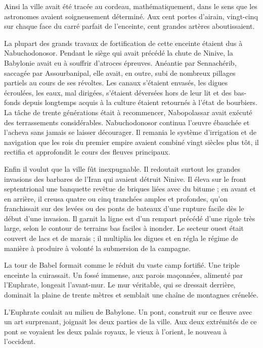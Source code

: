 \documentclass[a4paper, 11pt, oneside, polutonikogreek, french]{article}
\begin{document}
Ainsi la ville avait été tracée au cordeau, mathématiquement, dans le sens que les astronomes avaient soigneusement déterminé. Aux cent portes d'airain, vingt-cinq sur chaque face du carré parfait de l'enceinte, cent grandes artères aboutissaient.

\bigskip
\centerline{\EightStarTaper}
\centerline{\EightStarTaper\EightStarTaper}
\bigskip

La plupart des grands travaux de fortification de cette enceinte étaient dus à Nabuchodonosor. Pendant le siège qui avait précédé la chute de Ninive, la Babylonie avait eu à souffrir d'atroces épreuves. Anéantie par Sennachérib, saccagée par Assourbanipal, elle avait, en outre, subi de nombreux pillages partiels au cours de ses révoltes. Les canaux s'étaient envasés, les digues écroulées, les eaux, mal dirigées, s'étaient déversées hors de leur lit et des bas-fonds depuis longtemps acquis à la culture étaient retournés à l'état de bourbiers. La tâche de trente générations était à recommencer, Nabopolassar avait exécuté des terrassements considérables. Nabuchodonosor continua l'œuvre ébauchée et l'acheva sans jamais se laisser décourager. Il remania le système d'irrigation et de navigation que les rois du premier empire avaient combiné vingt siècles plus tôt, il rectifia et approfondit le cours des fleuves principaux.

Enfin il voulut que la ville fût inexpugnable. Il redoutait surtout les grandes invasions des barbares de l'Iran qui avaient détruit Ninive. Il éleva sur le front septentrional une banquette revêtue de briques liées avec du bitume ; en avant et en arrière, il creusa quatre ou cinq tranchées amples et profondes, qu'on franchissait sur des levées ou des ponts de bateaux d'une rupture facile dès le début d'une invasion. Il garnit la ligne est d'un rempart précédé d'une rigole très large, selon le contour de terrains bas faciles à inonder. Le secteur ouest était couvert de lacs et de marais ; il multiplia les digues et en régla le régime de manière à produire à volonté la submersion de la campagne.

La tour de Babel formait comme le réduit du vaste camp fortifié. Une triple enceinte la cuirassait. Un fossé immense, aux parois maçonnées, alimenté par l'Euphrate, longeait l'avant-mur. Le mur véritable, qui se dressait derrière, dominait la plaine de trente mètres et semblait une chaîne de montagnes crénelée.

L'Euphrate coulait au milieu de Babylone. Un pont, construit sur ce fleuve avec un art surprenant, joignait les deux parties de la ville. Aux deux extrémités de ce pont se voyaient les deux palais royaux, le vieux à l'orient, le nouveau à l'occident.
\end{document}
